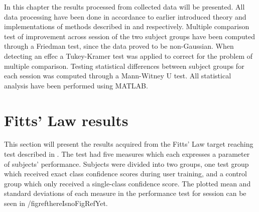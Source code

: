 
In this chapter the results processed from collected data will be presented. All data processing have been done in accordance to earlier introduced theory and implementations of methods described in  and  respectively. Multiple comparison test of improvement across session of the two subject groups have been computed through a Friedman test, since the data proved to be non-Gaussian. When detecting an effec a Tukey-Kramer test was applied to correct for the problem of multiple comparison. Testing statistical differences between subject groups for each session was computed through a Mann-Witney U test. All statistical analysis have been performed using MATLAB.


\section{Fitts' Law results} \label{sec:R:fitts}
This section will present the results acquired from the Fitts' Law target reaching test described in . The test had five measures which each expresses a parameter of subjects' performance. Subjects were divided into two groups, one test group which received exact class confidence scores during user training, and a control group which only received a single-class confidence score. The plotted mean and standard deviations of each measure in the performance test for session can be seen in /figref{thereIsnoFigRefYet}.

